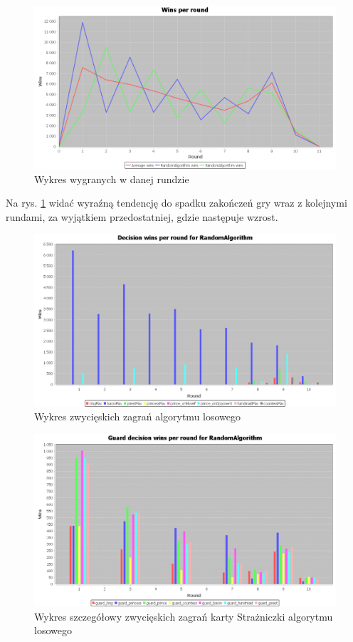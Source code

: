 \begin{figure}[H]
	\centering
	\includegraphics[width=\textwidth]{Resources/RVsR/RVsRroundwin.PNG}
	\caption{Wykres wygranych w danej rundzie} 
	\label{fig:RVsRroundwin}
\end{figure}

Na rys. \ref{fig:RVsRroundwin} widać wyraźną tendencję do spadku zakończeń gry wraz z kolejnymi rundami, za wyjątkiem przedostatniej, gdzie następuje wzrost.

\begin{figure}[H]
	\centering
	\includegraphics[width=\textwidth]{Resources/RVsR/RVsRdecision.PNG}
	\caption{Wykres zwycięskich zagrań algorytmu losowego} 
	\label{fig:RVsRdecision}
\end{figure} 

\begin{figure}[H]
	\centering
	\includegraphics[width=\textwidth]{Resources/RVsR/RVsRguarddecision.PNG}
	\caption{Wykres szczegółowy zwycięskich zagrań karty Strażniczki algorytmu losowego} 
	\label{fig:RVsRguarddecision}
\end{figure}

